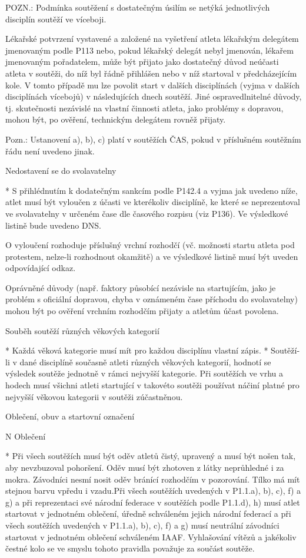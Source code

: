   POZN.: Podmínka soutěžení s dostatečným úsilím se netýká jednotlivých disciplín soutěží ve víceboji.

  \enditems
Lékařské potvrzení vystavené a založené na vyšetření atleta lékařským delegátem jmenovaným podle P113 nebo, pokud lékařský delegát nebyl jmenován, lékařem jmenovaným pořadatelem, může být přijato jako dostatečný důvod neúčasti atleta v soutěži, do níž byl řádně přihlášen nebo v níž startoval v předcházejícím kole. V tomto případě mu lze povolit start v dalších disciplínách (vyjma v dalších disciplínách vícebojů) v následujících dnech soutěží. Jiné ospravedlnitelné důvody, tj. skutečnosti nezávislé na vlastní činnosti atleta, jako problémy s dopravou, mohou být, po ověření, technickým delegátem rovněž přijaty.

Pozn.: Ustanovení a), b), c) platí v soutěžích ČAS, pokud v příslušném soutěžním řádu není uvedeno jinak.

Nedostavení se do svolavatelny

* S přihlédnutím k dodatečným sankcím podle P142.4 a vyjma jak uvedeno níže, atlet musí být vyloučen z účasti ve kterékoliv disciplíně, ke které se neprezentoval ve svolavatelny v určeném čase dle časového rozpisu (viz P136). Ve výsledkové listině bude uvedeno DNS.

O vyloučení rozhoduje příslušný vrchní rozhodčí (vč. možnosti startu atleta pod protestem, nelze-li rozhodnout okamžitě) a ve výsledkové listině musí být uveden odpovídající odkaz.

Oprávněné důvody (např. faktory působící nezávisle na startujícím, jako je problém s oficiální dopravou, chyba v oznámeném čase příchodu do svolavatelny) mohou být po ověření vrchním rozhodčím přijaty a atletům účast povolena.

Souběh soutěží různých věkových kategorií

* Každá věková kategorie musí mít pro každou disciplínu vlastní zápis.
* Soutěží-li v dané disciplíně současně atleti různých věkových kategorií, hodnotí se výsledek soutěže jednotně v rámci nejvyšší kategorie. Při soutěžích ve vrhu a hodech musí všichni atleti startující v takovéto soutěži používat náčiní platné pro nejvyšší věkovou kategorii v soutěži zúčastněnou.
\enditems

\secc Oblečení, obuv a startovní označení

\begitems \style N
Oblečení

* Při všech soutěžích musí být oděv atletů čistý, upravený a musí být nošen tak, aby nevzbuzoval pohoršení. Oděv musí být zhotoven z látky neprůhledné i za mokra. Závodníci nesmí nosit oděv bránící rozhodčím v pozorování. Tílko má mít stejnou barvu vpředu i vzadu.Při všech soutěžích uvedených v P1.1.a), b), c), f) a g) a při reprezentaci své národní federace v soutěžích podle P1.1.d), h) musí atlet startovat v jednotném oblečení, úředně schváleném jejich národní federací a při všech soutěžích uvedených v P1.1.a), b), c), f) a g) musí neutrální závodníci startovat v jednotném oblečení schváleném IAAF. Vyhlašování vítězů a jakékoliv čestné kolo se ve smyslu tohoto pravidla považuje za součást soutěže.

